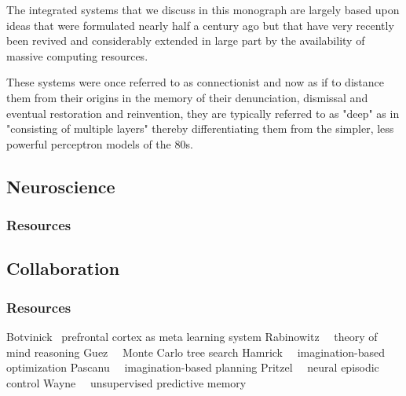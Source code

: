 The integrated systems that we discuss in this monograph are largely based upon ideas that were formulated nearly half a century ago but that have very recently been revived and considerably extended in large part by the availability of massive computing resources.

These systems were once referred to as connectionist and now as if to distance them from their origins in the memory of their denunciation, dismissal and eventual restoration and reinvention, they are typically referred to as "deep" as in "consisting of multiple layers" thereby differentiating them from the simpler, less powerful perceptron models of the 80s.


\subsection*{Neuroscience}

\subsubsection*{Resources}


\subsection*{Collaboration}

\subsubsection*{Resources}

Botvinick~\cite{WangetalBIORXIV-18} prefrontal cortex as meta learning system
Rabinowitz~\etal{}~\cite{RabinowitzetalCoRR-18} theory of mind reasoning
Guez~\etal{}~\cite{GuezetalCoRR-18} Monte Carlo tree search 
Hamrick~\etal{}~\cite{HamricketalCoRR-17} imagination-based optimization
Pascanu~\etal{}~\cite{PascanuetalCoRR-17} imagination-based planning
Pritzel~\etal{}~\cite{PritzeletalCoRR-17} neural episodic control
Wayne~\etal{}~\cite{WayneetalCoRR-18} unsupervised predictive memory



